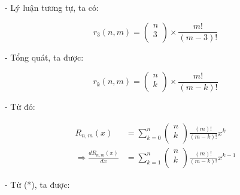 \documentclass[12pt]{article}
\begin{document}
\begin{sloppypar}
- Lý luận tương tự, ta có:

\begin{equation*}
    r_{3}(n,m) = \begin{pmatrix} n \\ 3 \\ \end{pmatrix} \times \frac{m!}{(m-3)!}
\end{equation*}

- Tổng quát, ta được:

\begin{equation*}
    r_{k}(n,m) = \begin{pmatrix} n \\ k \\ \end{pmatrix} \times \frac{m!}{(m-k)!}
\end{equation*}

- Từ đó:



\begin{align*}
    R_{n,m}(x) & = \sum_{k = 0}^{n} \begin{pmatrix} n \\ k \\ \end{pmatrix}\frac{(m)!}{(m-k)!}x^{k} \\
    \Rightarrow \frac{dR_{n,m}(x)}{dx} & = \sum_{k = 1}^{n} \begin{pmatrix} n \\ k \\ \end{pmatrix}\frac{(m)!}{(m-k)!}x^{k-1}
\end{align*}

- Từ (*), ta được:


\end{sloppypar}
\end{document}
